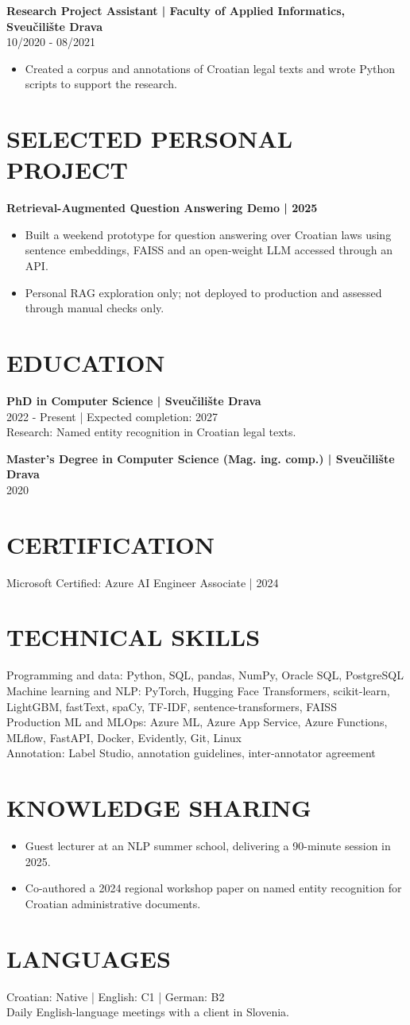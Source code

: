 \documentclass[11pt,a4paper]{article}
\newcommand{\cvsection}[1]{\section*{#1}}
\begin{document}
\textbf{Research Project Assistant | Faculty of Applied Informatics, Sveučilište Drava}\\
10/2020 - 08/2021
\begin{itemize}
\item Created a corpus and annotations of Croatian legal texts and wrote Python scripts to support the research.
\end{itemize}

\newpage
\cvsection{SELECTED PERSONAL PROJECT}
\textbf{Retrieval-Augmented Question Answering Demo | 2025}
\begin{itemize}
\item Built a weekend prototype for question answering over Croatian laws using sentence embeddings, FAISS and an open-weight LLM accessed through an API.
\item Personal RAG exploration only; not deployed to production and assessed through manual checks only.
\end{itemize}

\cvsection{EDUCATION}
\textbf{PhD in Computer Science | Sveučilište Drava}\\
2022 - Present | Expected completion: 2027\\
Research: Named entity recognition in Croatian legal texts.

\textbf{Master's Degree in Computer Science (Mag. ing. comp.) | Sveučilište Drava}\\
2020

\cvsection{CERTIFICATION}
Microsoft Certified: Azure AI Engineer Associate | 2024

\cvsection{TECHNICAL SKILLS}
Programming and data: Python, SQL, pandas, NumPy, Oracle SQL, PostgreSQL\\
Machine learning and NLP: PyTorch, Hugging Face Transformers, scikit-learn, LightGBM, fastText, spaCy, TF-IDF, sentence-transformers, FAISS\\
Production ML and MLOps: Azure ML, Azure App Service, Azure Functions, MLflow, FastAPI, Docker, Evidently, Git, Linux\\
Annotation: Label Studio, annotation guidelines, inter-annotator agreement

\cvsection{KNOWLEDGE SHARING}
\begin{itemize}
\item Guest lecturer at an NLP summer school, delivering a 90-minute session in 2025.
\item Co-authored a 2024 regional workshop paper on named entity recognition for Croatian administrative documents.
\end{itemize}

\cvsection{LANGUAGES}
Croatian: Native | English: C1 | German: B2\\
Daily English-language meetings with a client in Slovenia.
\end{document}
